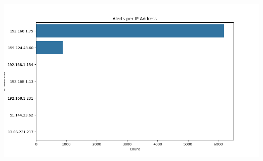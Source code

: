\documentclass{article}
\begin{document}
\includegraphics[width=\textwidth]{Screenshots/Alerts_per_IP_Address.png}
\end{document}

